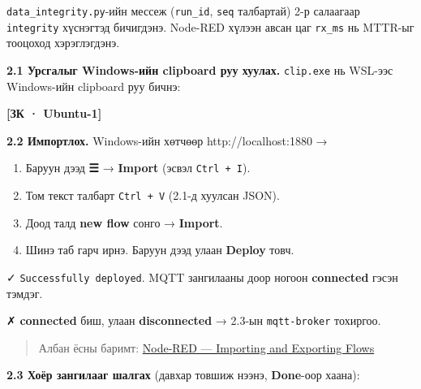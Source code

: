 \texttt{data\_\allowbreak{}integrity.\allowbreak{}py}-ийн мессеж (\texttt{run\_id}, \texttt{seq} талбартай) 2-р салаагаар \texttt{integrity} хүснэгтэд бичигдэнэ. Node-RED хүлээн авсан цаг \texttt{rx\_ms} нь MTTR-ыг тооцоход хэрэглэгдэнэ.

\textbf{2.1 Урсгалыг Windows-ийн clipboard руу хуулах.} \texttt{clip.exe} нь WSL-ээс Windows-ийн clipboard руу бичнэ:

\textbf{{[}ЗК · Ubuntu-1{]}}

\begin{Shaded}
\begin{Highlighting}[]
\KeywordTok{|} 
\end{Highlighting}
\end{Shaded}

\textbf{2.2 Импортлох.} Windows-ийн хөтчөөр http://localhost:1880 →

\begin{enumerate}
\def\labelenumi{\arabic{enumi}.}
\tightlist
\item
  Баруун дээд \textbf{☰} → \textbf{Import} (эсвэл \texttt{Ctrl\ +\ I}).
\item
  Том текст талбарт \texttt{Ctrl\ +\ V} (2.1-д хуулсан JSON).
\item
  Доод талд \textbf{new flow} сонго → \textbf{Import}.
\item
  Шинэ таб гарч ирнэ. Баруун дээд улаан \textbf{Deploy} товч.
\end{enumerate}

✓ \texttt{Successfully\ deployed}. MQTT зангилааны доор ногоон \textbf{connected} гэсэн тэмдэг.

✗ \textbf{connected} биш, улаан \textbf{disconnected} → 2.3-ын \texttt{mqtt-broker} тохиргоо.

\begin{quote}
Албан ёсны баримт: \href{https://nodered.org/docs/user-guide/editor/workspace/import-export}{Node-RED --- Importing and Exporting Flows}
\end{quote}

\textbf{2.3 Хоёр зангилааг шалгах} (давхар товшиж нээнэ, \textbf{Done}-оор хаана):

